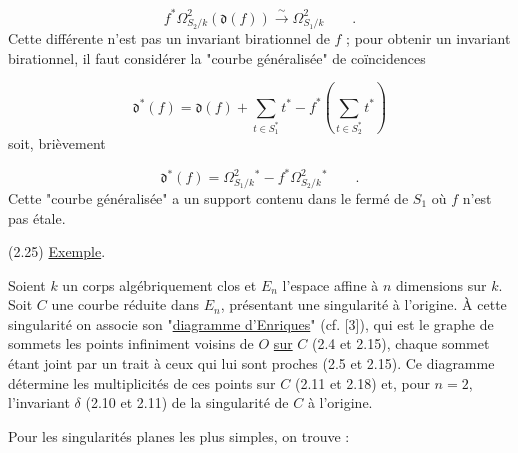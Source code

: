 \begin{equation*}
f^* \Omega^2_{S_2/k} (\mathfrak{d}(f)) \overset{\sim}{\longrightarrow} \Omega^2_{S_1/k} \qquad .
\end{equation*}
Cette différente n'est pas un invariant birationnel de $f$ ; pour obtenir un invariant birationnel, il faut considérer la "courbe généralisée" de coïncidences

\begin{equation*}
\mathfrak{d}^*(f) = \mathfrak{d}(f) + \sum_{t \in S_1^*} t^* - f^* ( \sum_{t \in S_2^*} t^*)
\end{equation*}
soit, brièvement

\begin{equation*}
\mathfrak{d}^*(f) = \Omega^2_{S_1/k}{}^* - f^* \Omega^2_{S_2/k}{}^* \qquad .
\end{equation*}
Cette "courbe généralisée" a un support contenu dans le fermé de $S_1$ où $f$ n'est pas étale.



(2.25) \underline{Exemple}.

Soient $k$ un corps algébriquement clos et $E_n$ l'espace affine à $n$ dimensions sur $k$. Soit $C$ une courbe réduite dans $E_n$, présentant une singularité à l'origine. À cette singularité on associe son "\underline{diagramme d'Enriques}" (cf. [3]), qui est le graphe de sommets les points infiniment voisins de $O$ \underline{sur} $C$ (2.4 et 2.15), chaque sommet étant joint par un trait à ceux qui lui sont proches (2.5 et 2.15). Ce diagramme détermine les multiplicités de ces points sur $C$ (2.11 et 2.18) et, pour $n = 2$, l'invariant $\delta$ (2.10 et 2.11) de la singularité de $C$ à l'origine.

Pour les singularités planes les plus simples, on trouve :

